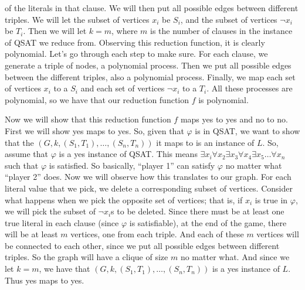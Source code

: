 \documentclass{article}
\begin{document}
\begin{description}
        of the literals in that clause. We will then
        put all possible edges between different triples. We will let the
        subset of vertices $x_i$ be $S_i$, and the subset of vertices
        $\neg x_i$ be $T_i$. Then we will let $k=m$, where $m$ is the number
        of clauses in the instance of QSAT we reduce from. Observing this
        reduction function, it is clearly polynomial. Let's go through each
        step to make sure. For each clause, we generate a triple of nodes,
        a polynomial process. Then we put all possible edges between the
        different triples, also a polynomial process. Finally, we map each set
        of vertices $x_i$ to a $S_i$ and each set of vertices $\neg x_i$ to a
        $T_i$. All these processes are polynomial, so we have that our reduction
        function $f$ is polynomial.

        Now we will show that this reduction function $f$ maps yes to yes and no
        to no. First we will show yes maps to yes. So, given that $\varphi$
        is in QSAT, we want to show that the
        $(G,k, (S_1, T_1), \dots, (S_n, T_n))$ it maps to is an instance of
        $L$. So, assume that $\varphi$ is a yes instance of QSAT. This means
        $\exists x_i \forall x_2 \exists x_3 \forall x_4 \exists x_5 \dots
        \forall x_n$ such that $\varphi$ is satisfied. So basically,
        ``player 1'' can satisfy $\varphi$ no matter what ``player 2'' does. Now
        we will observe how this translates to our graph. For each literal
        value that we pick, we delete a corresponding subset of vertices.
        Consider what happens when we pick the opposite set of vertices; that
        is, if $x_i$ is true in $\varphi$, we will pick the subset of $\neg
        x_i$s to be deleted. Since there must be at least one true literal in
        each clause (since $\varphi$ is satisfiable), at the end of the game,
        there will be at least $m$ vertices, one from each triple. And each of
        these $m$ vertices will be connected to each other, since we put all possible edges
        between different triples. So the graph will have a clique of size $m$
        no matter what. And since we let $k=m$, we have that $(G,k, (S_1, T_1),
        \dots, (S_n, T_n))$ is a yes instance of $L$. Thus yes maps to yes.


\end{description}
\end{document}
